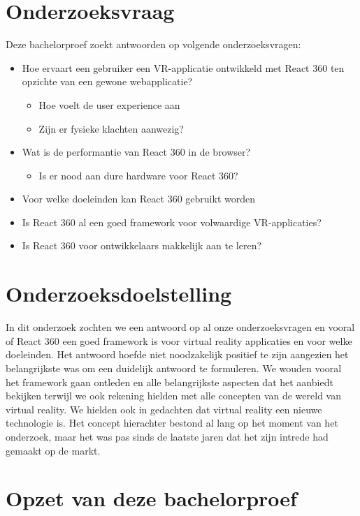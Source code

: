 \section{Onderzoeksvraag}
\label{sec:onderzoeksvraag}

Deze bachelorproef zoekt antwoorden op volgende onderzoeksvragen:
\begin{itemize}
  \item	Hoe ervaart een gebruiker een VR-applicatie ontwikkeld met React 360 ten opzichte van een gewone webapplicatie?
  \begin{itemize}
  \item	Hoe voelt de user experience aan
  \item	Zijn er fysieke klachten aanwezig?
  \end{itemize}
  \item	Wat is de performantie van React 360 in de browser?
\begin{itemize}
	\item Is er nood aan dure hardware voor React 360?
\end{itemize}
  \item	Voor welke doeleinden kan React 360 gebruikt worden
  \item	Is React 360 al een goed framework voor volwaardige VR-applicaties?
  \item Is React 360 voor ontwikkelaars makkelijk aan te leren?
\end{itemize}


\section{Onderzoeksdoelstelling}
\label{sec:onderzoeksdoelstelling}

In dit onderzoek zochten we een antwoord op al onze onderzoeksvragen en vooral of React 360 een goed framework is voor virtual reality applicaties en voor welke doeleinden. Het antwoord hoefde niet noodzakelijk positief te zijn aangezien het belangrijkste was om een duidelijk antwoord te formuleren. We wouden vooral het framework gaan ontleden en alle belangrijkste aspecten dat het aanbiedt bekijken terwijl we ook rekening hielden met alle concepten van de wereld van virtual reality. We hielden ook in gedachten dat virtual reality een nieuwe technologie is. Het concept hierachter bestond al lang op het moment van het onderzoek, maar het was pas sinds de laatste jaren dat het zijn intrede had gemaakt op de markt.

\section{Opzet van deze bachelorproef}
\label{sec:opzet-bachelorproef}

